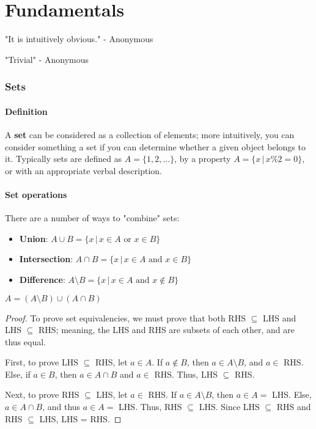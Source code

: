 \documentclass[12pt,oneside]{article}
\begin{document}
\part{Fundamentals}

\begin{displayquote}
  "It is intuitively obvious." - Anonymous
\end{displayquote}
\begin{displayquote}
  "Trivial" - Anonymous
\end{displayquote}
\section{Sets}
\subsection{Definition}
A \textbf{set} can be considered as a collection of elements; more intuitively, you can consider something a set if you can determine whether a given object belongs to it. Typically sets are defined as $A = \{1, 2, \dots\}$, by a property $A = \{x \,|\, x\%2 = 0\}$, or with an appropriate verbal description.

\subsection{Set operations}
There are a number of ways to "combine" sets:

\begin{itemize}
  \item \textbf{Union}: $A \cup B = \{x \,|\, x \in A \text{ or } x \in B\}$ 
  \item \textbf{Intersection}: $A \cap B = \{x \,|\, x \in A \text{ and } x \in B\}$ 
  \item \textbf{Difference}: $A \setminus B = \{x \,|\, x \in A \text{ and } x \notin B\}$ 
\end{itemize}

\begin{lemma}
  $A = (A\setminus B)\cup(A\cap B)$
\end{lemma}
\begin{proof}
  To prove set equivalencies, we must prove that both RHS $\subseteq$ LHS and LHS $\subseteq$ RHS; meaning, the LHS and RHS are subsets of each other, and are thus equal.
  
  First, to prove LHS $\subseteq$ RHS, let $a \in A$. If $a \notin B$, then $a \in A\setminus B$, and $a \in$ RHS. Else, if $a \in B$, then $a \in A \cap B$ and $a \in$ RHS. Thus, LHS $\subseteq$ RHS.

  Next, to prove RHS $\subseteq$ LHS, let $a \in $ RHS. If $a \in A \setminus B$, then $a \in A=$ LHS. Else, $a \in A \cap B$, and thus $a \in A=$ LHS. Thus, RHS $\subseteq$ LHS.
  Since LHS $\subseteq$ RHS and RHS $\subseteq$ LHS, LHS = RHS.
\end{proof}
\end{document}
